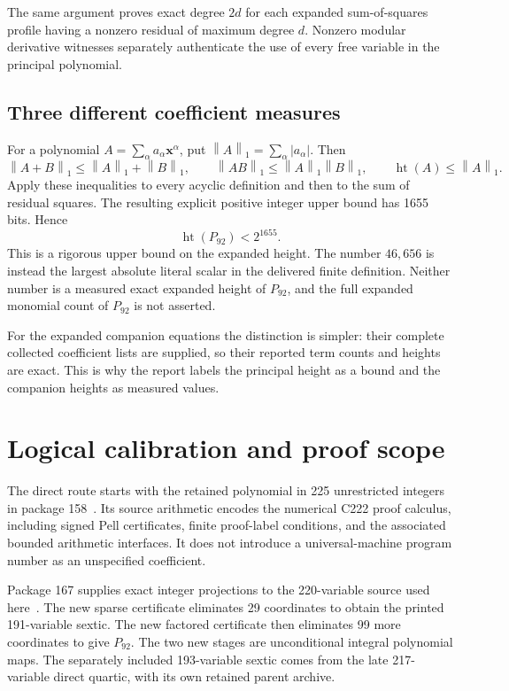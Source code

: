 \documentclass[11pt]{article}
\newcommand{\Ht}{\operatorname{ht}}
\newcommand{\normone}[1]{\left\lVert#1\right\rVert_1}
\begin{document}
The same argument proves exact degree $2d$ for each expanded
sum-of-squares profile having a nonzero residual of maximum degree $d$.
Nonzero modular derivative witnesses separately authenticate the use
of every free variable in the principal polynomial.

\subsection{Three different coefficient measures}

For a polynomial $A=\sum_\alpha a_\alpha\boldsymbol x^\alpha$, put
$\normone{A}=\sum_\alpha|a_\alpha|$. Then
\[
 \normone{A+B}\le\normone A+\normone B,
 \qquad \normone{AB}\le\normone A\normone B,
 \qquad \Ht(A)\le\normone A.
\]
Apply these inequalities to every acyclic definition and then to the
sum of residual squares. The resulting explicit positive integer
upper bound has 1655 bits. Hence
\[
                       \Ht(P_{92})<2^{1655}.
\]
This is a rigorous upper bound on the expanded height. The number
$46,656$ is instead the largest absolute literal scalar in the
delivered finite definition. Neither number is a measured exact
expanded height of $P_{92}$, and the full expanded monomial count of
$P_{92}$ is not asserted.

For the expanded companion equations the distinction is simpler:
their complete collected coefficient lists are supplied, so their
reported term counts and heights are exact. This is why the report
labels the principal height as a bound and the companion heights as
measured values.

\section{Logical calibration and proof scope}\label{sec:logic}

The direct route starts with the retained polynomial in 225 unrestricted
integers in package 158~\cite{p158}. Its source arithmetic encodes the
numerical C222 proof calculus, including signed Pell certificates,
finite proof-label conditions, and the associated bounded arithmetic
interfaces. It does not introduce a universal-machine program number
as an unspecified coefficient.

Package 167 supplies exact integer projections to the 220-variable
source used here~\cite{p167}. The new sparse certificate eliminates
29 coordinates to obtain the printed 191-variable sextic. The new
factored certificate then eliminates 99 more coordinates to give
$P_{92}$. The two new stages are unconditional integral polynomial
maps. The separately included 193-variable sextic comes from the
late 217-variable direct quartic, with its own retained parent archive.
\end{document}
